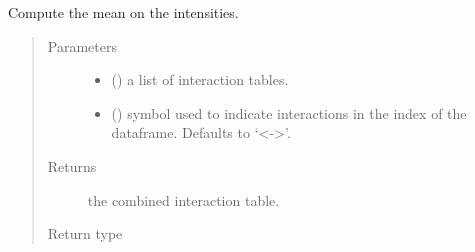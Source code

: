 \documentclass[letterpaper,10pt,english]{sphinxmanual}
\begin{document}
\begin{fulllineitems}
\label{\detokenize{_modules/cosifer.combiners:cosifer.combiners.cit.mean_table}}
Compute the mean on the intensities.
\begin{quote}\begin{description}
\item[{Parameters}] \leavevmode\begin{itemize}
\item {} 
 () \textendash{} a list of interaction tables.

\item {} 
 (\sphinxstyleliteralemphasis{\sphinxupquote{, }}) \textendash{} symbol used to indicate
interactions in the index of the dataframe. Defaults to ‘\textless{}-\textgreater{}’.

\end{itemize}

\item[{Returns}] \leavevmode
the combined interaction table.

\item[{Return type}] \leavevmode
{\hyperref[\detokenize{_modules/cosifer.collections:cosifer.collections.interaction_table.InteractionTable}]{}}

\end{description}\end{quote}

\end{fulllineitems}

\end{document}
